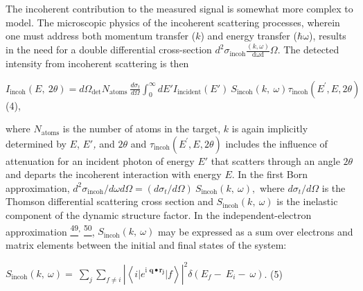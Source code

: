 The incoherent contribution to the measured signal is somewhat more
complex to model. The microscopic physics of the incoherent scattering
processes, wherein one must address both momentum transfer (\(k\)) and
energy transfer (\(\text{ℏω}\)), results in the need for a double
differential cross-section
\(d^{2}\sigma_{\text{incoh}}\frac{\left( k,\omega \right)}{\text{dωd}}\Omega\).
The detected intensity from incoherent scattering is then

\(I_{\text{incoh}}\left( E,\ 2\theta \right) = d\Omega_{\det}N_{\text{atoms}}\ \frac{d\sigma_{t}}{d\Omega}\int_{0}^{\infty}{dE'I_{\text{incident}}\left( E' \right)}\ S_{\text{incoh}}\left( k,\ \omega \right)\tau_{\text{incoh}}\left( E^{'},E,2\theta \right)\)
(4),

where \(N_{\text{atoms}}\) is the number of atoms in the target, \(k\)
is again implicitly determined by \(E\), \(E'\)\emph{,} and \(2\theta\)
and \(\tau_{\text{incoh}}\left( E^{'},E,2\theta \right)\) includes the
influence of attenuation for an incident photon of energy \(E'\) that
scatters through an angle \(2\theta\) and departs the incoherent
interaction with energy \(E\). In the first Born approximation,
\(d^{2}\sigma_{\text{incoh}}/d\omega d\Omega = (d\sigma_{t}/d\Omega)\ S_{\text{incoh}}\left( k,\ \omega \right),\)
where \(d\sigma_{t}/d\Omega\) is the Thomson differential scattering
cross section and \(S_{\text{incoh}}\left( k,\ \omega \right)\) is the
inelastic component of the dynamic structure factor. In the
independent-electron approximation
\hyperref[j.-chihara-journal-of-physics-condensed-matter-12-231-2000.]{\textsuperscript{49}}\textsuperscript{,}
\hyperref[w.-schuelke-electron-dynamics-by-inelastic-x-ray-scattering-oxford-university-press-new-york-2007.]{\textsuperscript{50}},
\(S_{\text{incoh}}\left( k,\ \omega \right)\) may be expressed as a sum
over electrons and matrix elements between the initial and final states
of the system:

\(S_{\text{incoh}}\left( k,\ \omega \right) = \ \sum_{j}^{}{\sum_{f \neq i}^{}{\left| \left\langle {i|e}^{\text{i\ }\mathbf{q \bullet}\mathbf{r}_{\mathbf{j}}}|f \right\rangle \right|^{2}\delta(E_{f} - \ E_{i} - \ \omega)}}\).
(5)


